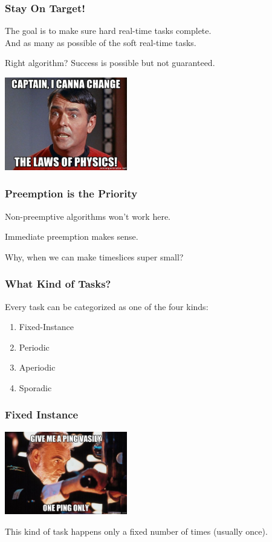 \begin{frame}
\frametitle{Stay On Target!}
The goal is to make sure hard real-time tasks complete.\\
\quad And as many as possible of the soft real-time tasks.

Right algorithm? Success is possible but not guaranteed.

\begin{center}
	\includegraphics[width=0.4\textwidth]{images/physics.jpg}
\end{center}

\end{frame}

\begin{frame}
\frametitle{Preemption is the Priority}

Non-preemptive algorithms won't work here.

Immediate preemption makes sense.

Why, when we can make timeslices super small?

\end{frame}

\begin{frame}
\frametitle{What Kind of Tasks?}

Every task can be categorized as one of the four kinds:

\begin{enumerate}
	\item Fixed-Instance
	\item Periodic
	\item Aperiodic
	\item Sporadic
\end{enumerate}

\end{frame}

\begin{frame}
\frametitle{Fixed Instance}

\begin{center}
	\includegraphics[width=0.4\textwidth]{images/oneping.jpg}
\end{center}

This kind of task happens only a fixed number of times (usually once).

\end{frame}

